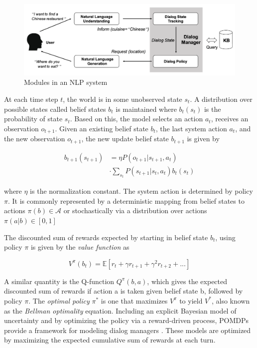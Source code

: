 \documentclass[11pt,a4paper]{article}
\begin{document}
\begin{figure}[t]
  \centering
  \includegraphics[width=\textwidth]{images/pipeline_framework.png}
  \caption{Modules in an NLP system}
  \label{fig:pipeline}
\end{figure}

At each time step $t$, the world is in some unobserved state $s_t$. A distribution over possible states called belief states $b_t$ is maintained where $b_t(s_t)$ is the probability of state $s_t$. Based on this, the model selects an action $a_t$, receives an observation $o_{t+1}$.
Given an existing belief state $b_t$, the last system action $a_t$, and the new observation $o_{t+1}$, the new update belief state $b_{t+1}$ is given by 

\begin{equation}
  \begin{split}
    b_{t+1}(s_{t+1}) &= \eta P(o_{t+1}|s_{t+1}, a_t) \\ & \cdot \sum\limits_{s_t} P(s_{t+1}|s_t, a_t) b_t(s_t)
  \end{split}
\end{equation}

where $\eta$ is the normalization constant. The system action is determined by policy $\pi$. It is commonly represented by a deterministic mapping from belief states to actions $\pi(b) \in \mathcal{A}$ or stochastically via a distribution over actions $\pi(a|b) \in [0,1]$\

The discounted sum of rewards expected by starting in belief state $b_t$, using policy $\pi$ is given by the \textit{value function} as 

\begin{equation}
  V^{\pi}(b_t) = \mathbb{E} [r_t + \gamma r_{t+1} + \gamma^2 r_{t+2} + ...]
\end{equation}

A similar quantity is the Q-function $Q^\pi (b,a)$, which gives the expected discounted sum of rewards if action a is taken given belief state b, followed by policy $\pi$. The \textit{optimal policy} $\pi^*$ is one that maximizes $V^\pi$ to yield $V^*$, also known as the \textit{Bellman optimality} equation. Including an explicit Bayesian model of uncertainty and by optimizing the policy via a reward-driven process, POMDPs provide a framework for modeling dialog managers \cite{Young2010TheHI}. These models are optimized by maximizing the expected cumulative sum of rewards at each turn.
\end{document}
